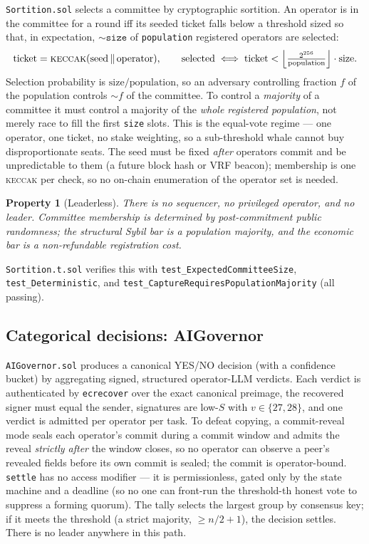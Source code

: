 \documentclass[11pt,a4paper]{article}
\newtheorem{property}{Property}
\begin{document}
\texttt{Sortition.sol} selects a committee by cryptographic sortition. An operator is in the committee for a round iff its seeded ticket falls below a threshold sized so that, in expectation, $\sim\!\texttt{size}$ of \texttt{population} registered operators are selected:
\[
  \text{ticket} = \textsc{keccak}(\text{seed} \,\|\, \text{operator}), \qquad \text{selected} \iff \text{ticket} < \Big\lfloor \tfrac{2^{256}}{\text{population}} \Big\rfloor \cdot \text{size}.
\]
Selection probability is $\text{size}/\text{population}$, so an adversary controlling fraction $f$ of the population controls $\sim\! f$ of the committee. To control a \emph{majority} of a committee it must control a majority of the \emph{whole registered population}, not merely race to fill the first \texttt{size} slots. This is the equal-vote regime --- one operator, one ticket, no stake weighting, so a sub-threshold whale cannot buy disproportionate seats. The seed must be fixed \emph{after} operators commit and be unpredictable to them (a future block hash or VRF beacon); membership is one \textsc{keccak} per check, so no on-chain enumeration of the operator set is needed.

\begin{property}[Leaderless]\label{prop:leaderless}
There is no sequencer, no privileged operator, and no leader. Committee membership is determined by post-commitment public randomness; the structural Sybil bar is a population majority, and the economic bar is a non-refundable registration cost.
\end{property}

\texttt{Sortition.t.sol} verifies this with \texttt{test\_ExpectedCommitteeSize}, \texttt{test\_Deterministic}, and \texttt{test\_CaptureRequiresPopulationMajority} (all passing).

\subsection{Categorical decisions: AIGovernor}\label{sec:governor}

\texttt{AIGovernor.sol} produces a canonical YES/NO decision (with a confidence bucket) by aggregating signed, structured operator-LLM verdicts. Each verdict is authenticated by \texttt{ecrecover} over the exact canonical preimage, the recovered signer must equal the sender, signatures are low-$S$ with $v \in \{27,28\}$, and one verdict is admitted per operator per task. To defeat copying, a commit-reveal mode seals each operator's commit during a commit window and admits the reveal \emph{strictly after} the window closes, so no operator can observe a peer's revealed fields before its own commit is sealed; the commit is operator-bound. \texttt{settle} has no access modifier --- it is permissionless, gated only by the state machine and a deadline (so no one can front-run the threshold-th honest vote to suppress a forming quorum). The tally selects the largest group by consensus key; if it meets the threshold (a strict majority, $\ge n/2 + 1$), the decision settles. There is no leader anywhere in this path.
\end{document}
